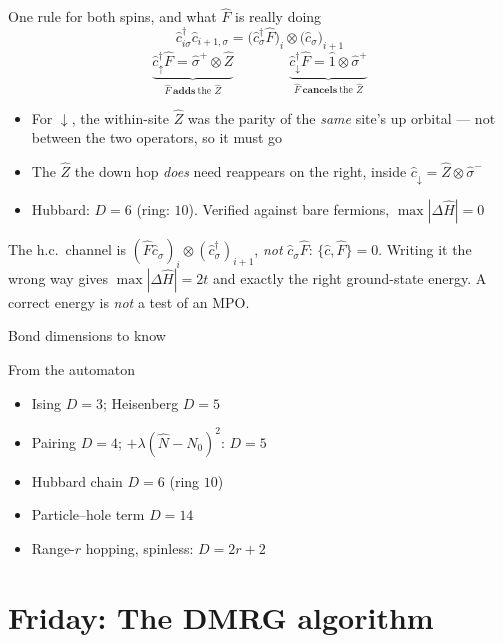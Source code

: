 \documentclass[aspectratio=169,10pt]{beamer}
\newcommand{\warnbox}[1]{%
  \begin{tcolorbox}[colback=palewarm,colframe=warm,title={\bfseries A trap to avoid}]
  #1
  \end{tcolorbox}}
\newcommand{\hH}{\hat{H}}
\begin{document}
\begin{frame}{One rule for both spins, and what $\hat F$ is really doing}
  \[
    \hat c^\dagger_{i\sigma}\hat c_{i+1,\sigma}=\bigl(\hat c^\dagger_\sigma\hat F\bigr)_i\otimes\bigl(\hat c_\sigma\bigr)_{i+1}
  \]
  \[
    \underbrace{\hat c^\dagger_\uparrow\hat F=\hat\sigma^+\!\otimes\hat Z}_{\hat F\ \textbf{adds}\ \text{the }\hat Z}
    \qquad\qquad
    \underbrace{\hat c^\dagger_\downarrow\hat F=\hat 1\otimes\hat\sigma^+}_{\hat F\ \textbf{cancels}\ \text{the }\hat Z}
  \]
  \begin{itemize}
    \item For $\downarrow$, the within-site $\hat Z$ was the parity of the \emph{same} site's up orbital --- not between the two operators, so it must go
    \item The $\hat Z$ the down hop \emph{does} need reappears on the right, inside $\hat c_\downarrow=\hat Z\otimes\hat\sigma^-$
    \item Hubbard: $D=6$ (ring: $10$). Verified against bare fermions, $\max|\Delta\hH|=0$
  \end{itemize}
  \warnbox{The h.c.\ channel is $(\hat F\hat c_\sigma)_i\otimes(\hat c^\dagger_\sigma)_{i+1}$, \emph{not} $\hat c_\sigma\hat F$: $\{\hat c,\hat F\}=0$. Writing it the wrong way gives $\max|\Delta\hH|=2t$ \alert{and exactly the right ground-state energy}. A correct energy is \textit{not} a test of an MPO.}
\end{frame}

\begin{frame}{Bond dimensions to know}

    \begin{block}{From the automaton}
      \begin{itemize}
        \item Ising $D=3$; Heisenberg $D=5$
        \item Pairing $D=4$; $+\lambda(\hat N-N_0)^2$: $D=5$
        \item Hubbard chain $D=6$ (ring $10$)
        \item Particle--hole term $D=14$
        \item Range-$r$ hopping, spinless: $D=2r+2$
      \end{itemize}
    \end{block}
\end{frame}

\section{Friday: The DMRG algorithm}
\end{document}
